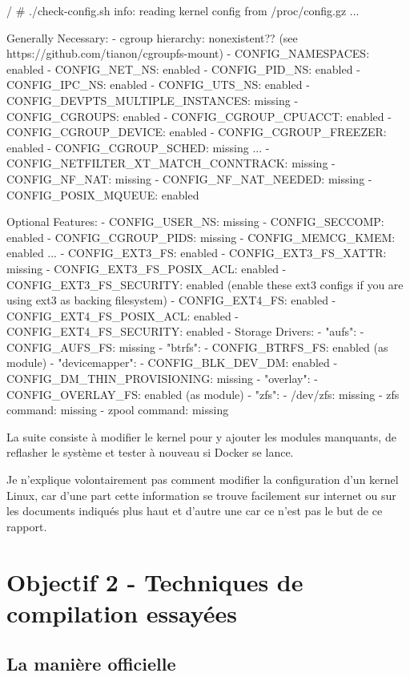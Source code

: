 \documentclass[11pt,a4paper,oneside]{report}
\begin{document}
\begin{bashcode}
/ # ./check-config.sh
info: reading kernel config from /proc/config.gz ...

Generally Necessary:
- cgroup hierarchy: nonexistent??
    (see https://github.com/tianon/cgroupfs-mount)
- CONFIG_NAMESPACES: enabled
- CONFIG_NET_NS: enabled
- CONFIG_PID_NS: enabled
- CONFIG_IPC_NS: enabled
- CONFIG_UTS_NS: enabled
- CONFIG_DEVPTS_MULTIPLE_INSTANCES: missing
- CONFIG_CGROUPS: enabled
- CONFIG_CGROUP_CPUACCT: enabled
- CONFIG_CGROUP_DEVICE: enabled
- CONFIG_CGROUP_FREEZER: enabled
- CONFIG_CGROUP_SCHED: missing
...
- CONFIG_NETFILTER_XT_MATCH_CONNTRACK: missing
- CONFIG_NF_NAT: missing
- CONFIG_NF_NAT_NEEDED: missing
- CONFIG_POSIX_MQUEUE: enabled

Optional Features:
- CONFIG_USER_NS: missing
- CONFIG_SECCOMP: enabled
- CONFIG_CGROUP_PIDS: missing
- CONFIG_MEMCG_KMEM: enabled
...
- CONFIG_EXT3_FS: enabled
- CONFIG_EXT3_FS_XATTR: missing
- CONFIG_EXT3_FS_POSIX_ACL: enabled
- CONFIG_EXT3_FS_SECURITY: enabled
    (enable these ext3 configs if you are using ext3 as backing filesystem)
- CONFIG_EXT4_FS: enabled
- CONFIG_EXT4_FS_POSIX_ACL: enabled
- CONFIG_EXT4_FS_SECURITY: enabled
- Storage Drivers:
  - "aufs":
    - CONFIG_AUFS_FS: missing
  - "btrfs":
    - CONFIG_BTRFS_FS: enabled (as module)
  - "devicemapper":
    - CONFIG_BLK_DEV_DM: enabled
    - CONFIG_DM_THIN_PROVISIONING: missing
  - "overlay":
    - CONFIG_OVERLAY_FS: enabled (as module)
  - "zfs":
    - /dev/zfs: missing
    - zfs command: missing
    - zpool command: missing
\end{bashcode}

La suite consiste à modifier le kernel pour y ajouter les modules manquants, de reflasher le système et tester à nouveau si Docker se lance.

Je n'explique volontairement pas comment modifier la configuration d'un kernel Linux, car d'une part cette information se trouve facilement sur internet ou sur les documents indiqués plus haut et d'autre une car ce n'est pas le but de ce rapport.

\chapter{Objectif 2 - Techniques de compilation essayées}

\section{La manière officielle}\label{maniere_officielle}
\end{document}
